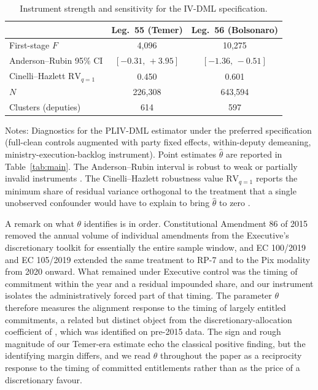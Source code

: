\documentclass[pdflatex,sn-basic]{sn-jnl}
\begin{document}
\begin{table}[htbp]
\centering
\caption{Instrument strength and sensitivity for the IV-DML specification.}
\label{tab:iv_validation}
\small
\setlength{\tabcolsep}{6pt}
\begin{tabular}{@{}lcc@{}}
\toprule
& Leg.~55 (Temer) & Leg.~56 (Bolsonaro) \\
\midrule
First-stage $F$                      & 4{,}096           & 10{,}275          \\
Anderson--Rubin 95\% CI              & $[-0.31,\,+3.95]$ & $[-1.36,\,-0.51]$ \\
Cinelli--Hazlett $\mathrm{RV}_{q=1}$  & 0.450             & 0.601             \\
$N$                                  & 226{,}308          & 643{,}594          \\
Clusters (deputies)                  & 614               & 597               \\
\bottomrule
\end{tabular}
\begin{tablenotes}
\small
\item Notes: Diagnostics for the PLIV-DML estimator under the preferred specification (full-clean controls augmented with party fixed effects, within-deputy demeaning, ministry-execution-backlog instrument). Point estimates $\hat\theta$ are reported in Table~\ref{tab:main}. The Anderson--Rubin interval is robust to weak or partially invalid instruments \citep{AndersonRubin1949}. The Cinelli--Hazlett robustness value $\mathrm{RV}_{q=1}$ reports the minimum share of residual variance orthogonal to the treatment that a single unobserved confounder would have to explain to bring $\hat\theta$ to zero \citep{CinelliHazlett2020}.
\end{tablenotes}
\end{table}

A remark on what $\theta$ identifies is in order. Constitutional Amendment 86 of 2015 removed the annual volume of individual amendments from the Executive's discretionary toolkit for essentially the entire sample window, and EC 100/2019 and EC 105/2019 extended the same treatment to RP-7 and to the Pix modality from 2020 onward. What remained under Executive control was the timing of commitment within the year and a residual impounded share, and our instrument isolates the administratively forced part of that timing. The parameter $\theta$ therefore measures the alignment response to the timing of largely entitled commitments, a related but distinct object from the discretionary-allocation coefficient of \citet{PereiraAndMueller2004}, which was identified on pre-2015 data. The sign and rough magnitude of our Temer-era estimate echo the classical positive finding, but the identifying margin differs, and we read $\theta$ throughout the paper as a reciprocity response to the timing of committed entitlements rather than as the price of a discretionary favour.
\end{document}
